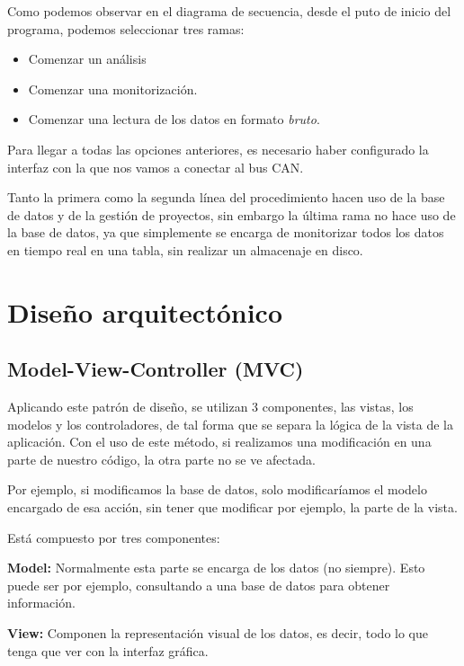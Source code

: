 
Como podemos observar en el diagrama de secuencia, desde el puto de inicio del programa, podemos seleccionar tres ramas:
\begin{itemize}
\item
Comenzar un análisis
\item
Comenzar una monitorización.
\item
Comenzar una lectura de los datos en formato \emph{bruto}.
\end{itemize}

Para llegar a todas las opciones anteriores, es necesario haber configurado la interfaz con la que nos vamos a conectar al bus CAN.

Tanto la primera como la segunda línea del procedimiento hacen uso de la base de datos y de la gestión de proyectos, sin embargo la última rama no hace uso de la base de datos, ya que simplemente se encarga de monitorizar todos los datos en tiempo real en una tabla, sin realizar un almacenaje en disco.

\section{Diseño arquitectónico}

\subsection{Model-View-Controller (MVC)}

Aplicando este patrón de diseño, se utilizan 3 componentes, las vistas, los modelos y los controladores, de tal forma que se separa la lógica de la vista de la aplicación. Con el uso de este método, si realizamos una modificación en una parte de nuestro código, la otra parte no se ve afectada.

Por ejemplo, si modificamos la base de datos, solo modificaríamos el modelo encargado de esa acción, sin tener que modificar por ejemplo, la parte de la vista.

Está compuesto por tres componentes:

\textbf{Model:} Normalmente esta parte se encarga de los datos (no siempre). Esto puede ser por ejemplo, consultando a una base de datos para obtener información.

\textbf{View:} Componen la representación visual de los datos, es decir, todo lo que tenga que ver con la interfaz gráfica.

